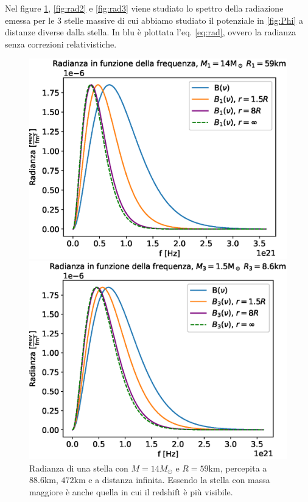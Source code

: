 \documentclass[a4paper, titlepage]{article}
\begin{document}
Nel figure \ref{fig:rad1}, \ref{fig:rad2} e \ref{fig:rad3} viene studiato lo spettro della radiazione emessa per le 3 stelle massive di cui abbiamo studiato il potenziale in \ref{fig:Phi} a distanze diverse dalla stella.
In blu è plottata l'eq. \ref{eq:rad}, ovvero la radianza senza correzioni relativistiche.

\begin{figure}[h]
    \begin{minipage}{0.49\textwidth}
        \centering
        \includegraphics[width = \textwidth]{Figures/radianza1.eps}
        \caption{Radianza di una stella con $M = 14M_\odot$ e $R = 59\unit{\kilo\meter}$, percepita a $88.6 \unit{\kilo\meter}$, $472 \unit{\kilo\meter}$ e a distanza infinita.
        Essendo la stella con massa maggiore è anche quella in cui il redshift è più visibile.}
        \label{fig:rad1}
    \end{minipage}
    \hspace{0.015\textwidth}    
    \begin{minipage}{0.49\textwidth}
        \centering
        \includegraphics[width = \textwidth]{Figures/radianza3.eps}

\end{minipage}
\end{figure}
\end{document}
